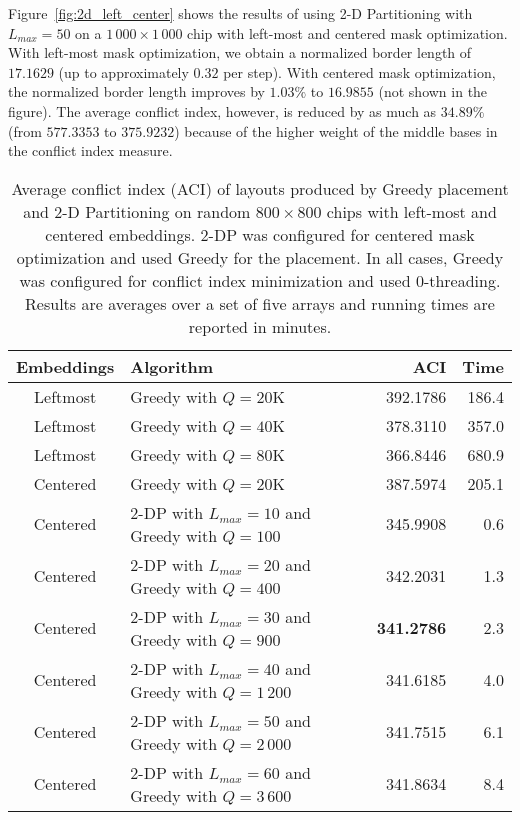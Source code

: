 Figure~\ref{fig:2d_left_center} shows the results of using 2-D Partitioning with
$L_{max}=50$ on a $1\,000\times 1\,000$ chip with left-most and centered mask
optimization. With left-most mask optimization, we obtain a normalized border
length of $17.1629$ (up to approximately $0.32$ per step). With centered mask
optimization, the normalized border length improves by $1.03\%$ to $16.9855$
(not shown in the figure). The average conflict index, however, is reduced by as
much as $34.89\%$ (from $577.3353$ to $375.9232$) because of the higher weight
of the middle bases in the conflict index measure.

\begin{table}[t!]\centering
\caption{\label{tab:2dp_greedy}
  Average conflict index (ACI) of layouts produced by Greedy placement and 2-D
  Partitioning on random $800\times 800$ chips with left-most and centered
  embeddings. 2-DP was configured for centered mask optimization and used Greedy
  for the placement. In all cases, Greedy was configured for conflict index
  minimization and used $0$-threading. Results are averages over a set of five
  arrays and running times are reported in minutes.}
\footnotesize{
\begin{tabular}{clrr}
Embeddings & Algorithm & ACI & Time \\
\hline
Leftmost   & Greedy with $Q=20$K & 392.1786 & 186.4 \\
Leftmost   & Greedy with $Q=40$K & 378.3110 & 357.0 \\
Leftmost   & Greedy with $Q=80$K & 366.8446 & 680.9 \\
\hline
Centered   & Greedy with $Q=20$K & 387.5974 & 205.1 \\
\hline
Centered   & 2-DP with $L_{max}=10$ and Greedy with $Q=100$    &      345.9908  & 0.6 \\
Centered   & 2-DP with $L_{max}=20$ and Greedy with $Q=400$    &      342.2031  & 1.3 \\
Centered   & 2-DP with $L_{max}=30$ and Greedy with $Q=900$    & {\bf 341.2786} & 2.3 \\
Centered   & 2-DP with $L_{max}=40$ and Greedy with $Q=1\,200$ &      341.6185  & 4.0 \\
Centered   & 2-DP with $L_{max}=50$ and Greedy with $Q=2\,000$ &      341.7515  & 6.1 \\
Centered   & 2-DP with $L_{max}=60$ and Greedy with $Q=3\,600$ &      341.8634  & 8.4 \\
\hline
\end{tabular}}
\end{table}

